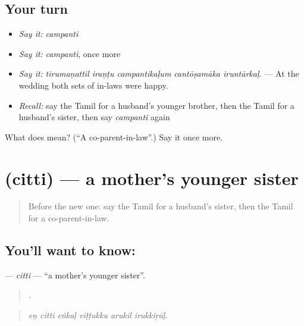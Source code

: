\subsection*{Your turn}
\begin{itemize}
\raggedright
  \item \emph{Say it:} \emph{campanti}
  \item \emph{Say it:} \emph{campanti}, once more
  \item \emph{Say it:} \emph{tirumaṇattil iraṇṭu campantikaḷum cantōṣamāka iruntārkaḷ.} — At the wedding both sets of in-laws were happy.
  \item \emph{Recall:} say the Tamil for a husband’s younger brother, then the Tamil for a husband’s sister, then say \emph{campanti} again
\end{itemize}

\begin{tcolorbox}[breakable,colback=teal!4,colframe=teal!35!black,title={Before you move on}]
What does  mean? (\textquotedblleft{}A co-parent-in-law\textquotedblright{}.) Say it once more.
\end{tcolorbox}
\section[\texorpdfstring{\ta{சித்தி} (citti)}{சித்தி (citti)}]{ (citti) — a mother’s younger sister}

\label{lesson:TA-C493-citti}



\begin{quote}
Before the new one: say the Tamil for a husband’s sister, then the Tamil for a co-parent-in-law.
\end{quote}

\subsection*{You'll want to know: }
\textbf{} — \emph{citti} — \textquotedblleft{}a mother’s younger sister\textquotedblright{}.

\begin{quote}
     .
\end{quote}

\begin{quote}
\emph{eṉ citti eṅkaḷ vīṭṭukku arukil irukkiṟāḷ.}
\end{quote}

